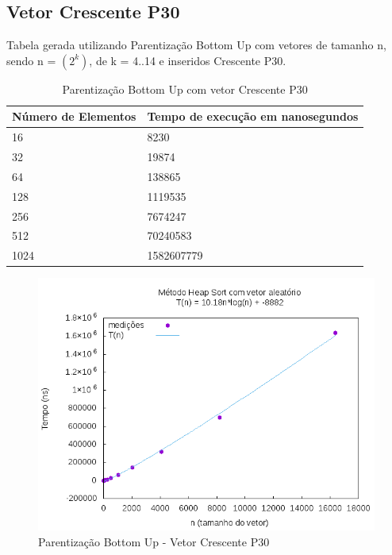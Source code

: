 \documentclass[12pt,a4paper,twoside]{report}
\begin{document}
\subsection{Vetor Crescente P30}
Tabela gerada utilizando Parentização Bottom Up com vetores de tamanho n, sendo n = $(2^k)$, de k = 4..14 e inseridos Crescente P30.
\begin{table}[H]
\centering
\caption{Parentização Bottom Up com vetor Crescente P30}
\label{my-label}
\begin{tabular}{|l|l|}
\hline
\multicolumn{1}{|c|}{\textbf{Número de Elementos}} & \multicolumn{1}{c|}{\textbf{Tempo de execução em nanosegundos}} \\ \hline
16 & 8230 \\ \hline
32 & 19874 \\ \hline
64 & 138865 \\ \hline
128 & 1119535 \\ \hline
256 & 7674247 \\ \hline
512 & 70240583 \\ \hline
1024 & 1582607779 \\ \hline
\end{tabular}
\end{table}

\begin{figure}[H]
    \centering
    \includegraphics[width=0.7\linewidth]{graficos/HeapSort/vIntAleatorio/vIntAleatorio.png}
  \caption{Parentização Bottom Up - Vetor Crescente P30}
\end{figure}
\end{document}
